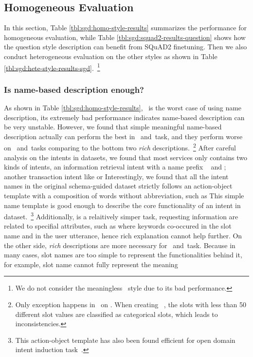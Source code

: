 \subsection{Homogeneous Evaluation}
\label{ssec:sgd:homo-eval}
In this section, Table \ref{tbl:sgd:homo-style-results} summarizes the
performance for homogeneous evaluation, while Table
\ref{tbl:sgd:squad2-results-question} shows how the question style
description can benefit from SQuAD2 finetuning. Then we also conduct
heterogeneous evaluation on the other styles as
shown in Table \ref{tbl:sgd:hete-style-results-sgd}.~\footnote{We do not
  consider the meaningless \ID~style due to its bad performance.}
%
\subsubsection{Is name-based description enough?}
\label{sssec:sgd:question-name}
As shown in Table \ref{tbl:sgd:homo-style-results}, \ID~is the worst
case of using name description, its extremely bad performance
indicates name-based description can be very unstable. However, we
found that simple meaningful name-based description actually can
perform the best in \IC~and~\RSI task, and they perform worse on
\CSL~and~\NSL tasks comparing to the bottom two {\it rich}
descriptions.~\footnote{Only exception happens in \CSL~on
  \multiwoz. When creating \multiwoz~\cite{zang-etal-2020-multiwoz},
  the slots with less than 50 different slot values are classified as
  categorical slots, which leads to inconsistencies.} After careful
analysis on the intents in \sgdst datasets, we found that most
services only contains two kinds of intents, an information retrieval
intent with a name prefix ~ and
; another transaction intent like 
 or  Interestingly, we found that
all the intent names in the original schema-guided dataset strictly
follows an action-object template with a composition of words without
abbreviation, such as  
This simple name template is good enough to describe the core
functionality of an intent in \sgdst dataset.~\footnote{This
  action-object template has also been found efficient for open domain
  intent induction task~\citep[\eg, OPINE][]{vedula2020open}.}
Additionally, \RSI is a relaitively simper task, requesting
information are related to specifial attributes, such as
  where keywords
co-occured in the slot name and in the user utterance, hence rich
explanation cannot help further. On the other side, {\it rich}
descriptions are more necessary for \CSL~and~\NSL task. Because in
many cases, slot names are too simple to represent the functionalities
behind it, for example, slot name  cannot fully represent
the meaning 


